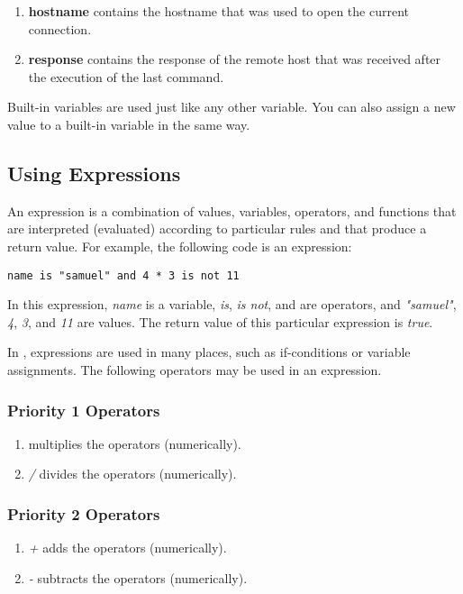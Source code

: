\begin{enumerate}
\item {\bf hostname} contains the hostname that was used to open the 
current connection.
\item {\bf response} contains the response of the remote host that was 
received after the execution of the last command. 
\end{enumerate}

Built-in variables are used just like any other variable. You can also 
assign a new value to a built-in variable in the same way. 


\subsection{Using Expressions}

An expression is a combination of values, variables, operators, and functions 
that are interpreted (evaluated) according to particular rules and that 
produce a return value. For example, the following code is an expression:

\begin{lstlisting}
name is "samuel" and 4 * 3 is not 11
\end{lstlisting}

In this expression, {\it name} is a variable, {\it is}, {\it is not}, and 
{\it *} are operators, and {\it "samuel"}, {\it 4}, {\it 3}, and {\it 11} 
are values. The return value of this particular expression is {\it true}.

In \product, expressions are used in many places, such as if-conditions or 
variable assignments. The following operators may be used in an expression. 


\subsubsection{Priority 1 Operators}

\begin{enumerate}
\item {\it *} multiplies the operators (numerically).
\item {\it /} divides the operators (numerically).
\end{enumerate}


\subsubsection{Priority 2 Operators}

\begin{enumerate}
\item {\it +} adds the operators (numerically). 
\item {\it -} subtracts the operators (numerically). 
\end{enumerate}


